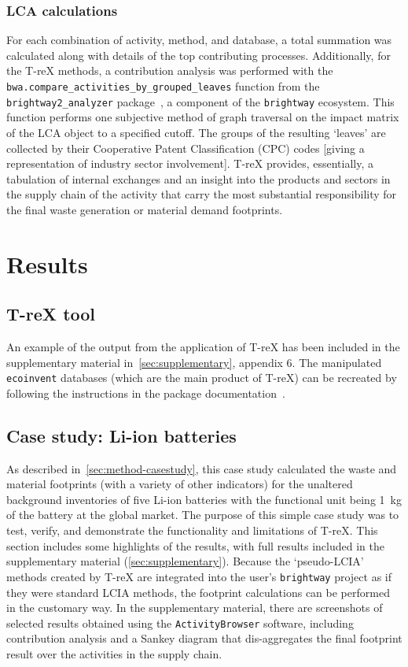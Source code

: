 \documentclass[a4paper,fleqn]{cas-dc}
\renewcommand{\texttt}[1]{{\ttfamily\small\nolinkurl{#1}}}
\begin{document}
\subsubsection{LCA calculations}
For each combination of activity, method, and database, a total summation was
calculated along with details of the top contributing processes. Additionally,
for the T-reX methods, a contribution analysis was performed with the
\texttt{bwa.compare\_activities\_by\_grouped\_leaves} function from the
\texttt{brightway2\_analyzer} package~\citep{mutel2016brightway2analyzer}, a
component of the \texttt{brightway} ecosystem. This function performs one
subjective method of graph traversal on the impact matrix of the LCA object to
a specified cutoff. The groups of the resulting `leaves' are collected by their
Cooperative Patent Classification (CPC) codes [giving a representation of
		industry sector involvement]. T-reX provides, essentially, a tabulation of
internal exchanges and an insight into the products and sectors in the supply
chain of the activity that carry the most substantial responsibility for the
final waste generation or material demand footprints.

\section{Results}\label{sec:results}
\subsection{T-reX tool}\label{sec:results-T-reX}

An example of the output from the application of T-reX has been included in the
supplementary material in~\autoref{sec:supplementary}, appendix 6. The
manipulated \texttt{ecoinvent} databases (which are the main product of T-reX)
can be recreated by following the instructions in the package
documentation~\citep{mcdowall2023T-reXdocs}.

\subsection{Case study: Li-ion batteries}\label{sec:results-casestudy}

As described in~\autoref{sec:method-casestudy}, this case study calculated the
waste and material footprints (with a variety of other indicators) for the
unaltered background inventories of five Li-ion batteries with the functional
unit being 1~kg of the battery at the global market. The purpose of this simple
case study was to test, verify, and demonstrate the functionality and
limitations of T-reX. This section includes some highlights of the results,
with full results included in the supplementary material
(\autoref{sec:supplementary}). Because the `pseudo-LCIA' methods created by
T-reX are integrated into the user's \texttt{brightway} project as if they were
standard LCIA methods, the footprint calculations can be performed in the
customary way. In the supplementary material, there are screenshots of selected
results obtained using the \texttt{ActivityBrowser} software, including
contribution analysis and a Sankey diagram that dis-aggregates the final
footprint result over the activities in the supply chain.
\end{document}
